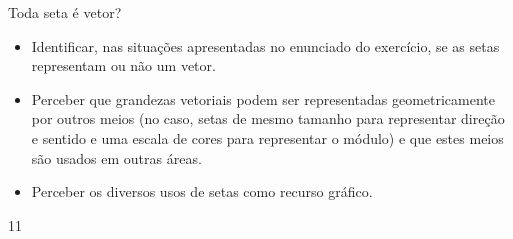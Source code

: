 \clearpage
\def\currentcolor{session2}

\begin{objectives}{Toda seta é vetor?}
{
\begin{itemize}
\item {} 
Identificar, nas situações apresentadas no enunciado do exercício, se as setas representam ou não um vetor.

\item {} 
Perceber que grandezas vetoriais podem ser representadas geometricamente por outros meios (no caso, setas de mesmo tamanho para representar direção e sentido e uma escala de cores para representar o módulo) e que estes meios são usados em outras áreas.

\item {} 
Perceber os diversos usos de setas como recurso gráfico.
\end{itemize}
}{1}{1}
\end{objectives}

